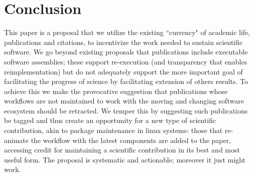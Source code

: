 \documentclass{sigchi}
\begin{document}
\section{Conclusion}

This paper is a proposal that we utilize the existing ``currency" of academic life, publications and citations, to incentivize the work needed to sustain scientific software. We go beyond existing proposals that publications include executable software assemblies; these support re-execution (and transparency that enables reimplementation) but do not adequately support the more important goal of facilitating the progress of science by facilitating extension of others results.  To achieve this we make the provocative suggestion that publications whose workflows are not maintained to work with the moving and changing software ecosystem should be retracted. We temper this by suggesting such publications be tagged and thus create an opportunity for a new type of scientific contribution, akin to package maintenance in linux systems: those that re-animate the workflow with the latest components are added to the paper, accessing credit for maintaining a scientific contribution in its best and most useful form. The proposal is systematic and actionable; moreover it just might work.

%
%
%
%
%
\balance



\end{document}
